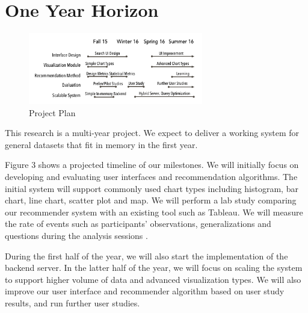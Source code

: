 \section*{One Year Horizon}

\begin{figure}
\vspace{-0.2in}

  \includegraphics[width=3in]{gantt-chart.png}
  \vspace{-0.2in}
  \caption{Project Plan}

\label{fig:plan}
\end{figure}


This research is a multi-year project.  We expect to deliver a working system for general datasets that fit in memory in the first year.

Figure 3 shows a projected timeline of our milestones.  We will initially focus on developing and evaluating user interfaces and recommendation algorithms.   The initial system will support commonly used chart types including histogram, bar chart, line chart, scatter plot and map.  We will perform a lab study comparing our recommender system with an existing tool such as Tableau.  We will measure the rate of events such as participants’ observations, generalizations and questions during the analysis sessions \cite{liu:latency}.

During the first half of the year, we will also start the implementation of the backend server.  In the latter half of the year, we will focus on scaling the system to support higher volume of data and advanced visualization types. We will also improve our user interface and recommender algorithm based on user study results, and run further user studies.

